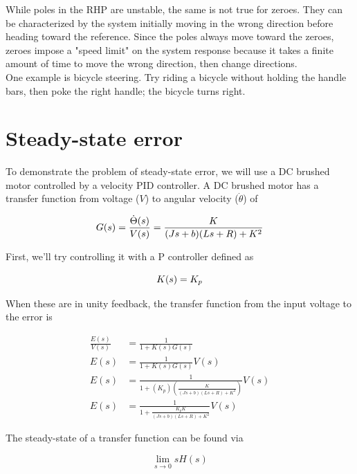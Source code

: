 \documentclass[10pt,conference,compsoc]{IEEEtran}
\begin{document}
While poles in the RHP are unstable, the same is not true for zeroes. They can
be characterized by the \gls{system} initially moving in the wrong direction
before heading toward the \gls{reference}. Since the poles always move toward
the zeroes, zeroes impose a "speed limit" on the \gls{system} response because
it takes a finite amount of time to move the wrong direction, then change
directions. \\

\noindent One example is bicycle steering. Try riding a bicycle without holding
the handle bars, then poke the right handle; the bicycle turns right.

\section{Steady-state error}

\noindent To demonstrate the problem of \gls{steady-state error}, we will use a
DC brushed motor controlled by a velocity PID controller. A DC brushed motor has
a transfer function from voltage ($V$) to angular velocity ($\dot{\theta}$) of

\begin{equation}
  G(s) = \frac{\dot{\Theta}(s)}{V(s)} = \frac{K}{(Js+b)(Ls+R)+K^2} \\
\end{equation}

\noindent First, we'll try controlling it with a P controller defined as

\begin{equation*}
  K(s) = K_p \\
\end{equation*}

\noindent When these are in unity feedback, the transfer function from the input
voltage to the error is

\begin{align*}
  \frac{E(s)}{V(s)} &= \frac{1}{1 + K(s)G(s)} \\
  E(s) &= \frac{1}{1 + K(s)G(s)} V(s) \\
  E(s) &= \frac{1}{1 + (K_p) \left(\frac{K}{(Js+b)(Ls+R)+K^2}\right)} V(s) \\
  E(s) &= \frac{1}{1 + \frac{K_p K}{(Js+b)(Ls+R)+K^2}} V(s)
\end{align*}

The steady-state of a transfer function can be found via

\begin{equation}
  \lim_{s\to0} sH(s)
\end{equation}
\end{document}
